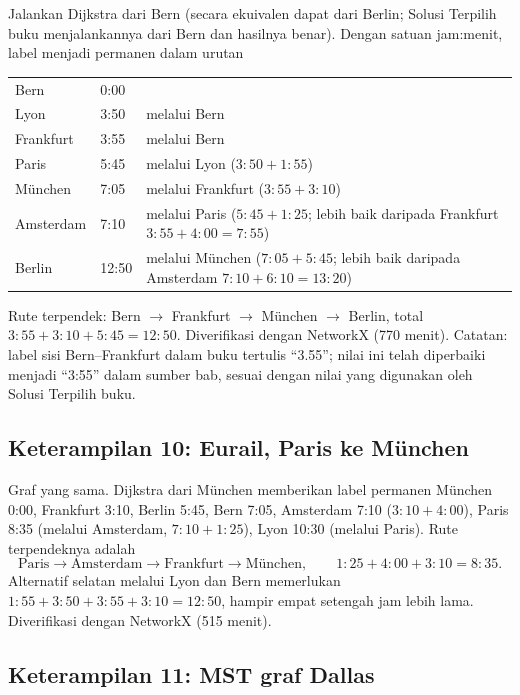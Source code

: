 Jalankan Dijkstra dari Bern (secara ekuivalen dapat dari Berlin; Solusi Terpilih buku menjalankannya dari Bern dan hasilnya benar). Dengan satuan jam:menit, label menjadi permanen dalam urutan
\begin{center}
\small
\begin{tabularx}{\linewidth}{@{}llX@{}}
Bern & 0:00 & \\
Lyon & 3:50 & melalui Bern \\
Frankfurt & 3:55 & melalui Bern \\
Paris & 5:45 & melalui Lyon ($3{:}50 + 1{:}55$) \\
M\"unchen & 7:05 & melalui Frankfurt ($3{:}55 + 3{:}10$) \\
Amsterdam & 7:10 & melalui Paris ($5{:}45 + 1{:}25$; lebih baik daripada Frankfurt $3{:}55 + 4{:}00 = 7{:}55$) \\
Berlin & 12:50 & melalui M\"unchen ($7{:}05 + 5{:}45$; lebih baik daripada Amsterdam $7{:}10 + 6{:}10 = 13{:}20$) \\
\end{tabularx}
\end{center}
Rute terpendek: Bern $\to$ Frankfurt $\to$ M\"unchen $\to$ Berlin, total $3{:}55 + 3{:}10 + 5{:}45 = 12{:}50$. Diverifikasi dengan NetworkX (770 menit). Catatan: label sisi Bern--Frankfurt dalam buku tertulis ``3.55''; nilai ini telah diperbaiki menjadi ``3:55'' dalam sumber bab, sesuai dengan nilai yang digunakan oleh Solusi Terpilih buku.

\subsection*{Keterampilan 10: Eurail, Paris ke M\"unchen}

Graf yang sama. Dijkstra dari M\"unchen memberikan label permanen M\"unchen 0:00, Frankfurt 3:10, Berlin 5:45, Bern 7:05, Amsterdam 7:10 ($3{:}10 + 4{:}00$), Paris 8:35 (melalui Amsterdam, $7{:}10 + 1{:}25$), Lyon 10:30 (melalui Paris). Rute terpendeknya adalah
\[
\text{Paris} \to \text{Amsterdam} \to \text{Frankfurt} \to \text{M\"unchen},
\qquad 1{:}25 + 4{:}00 + 3{:}10 = 8{:}35.
\]
Alternatif selatan melalui Lyon dan Bern memerlukan $1{:}55 + 3{:}50 + 3{:}55 + 3{:}10 = 12{:}50$, hampir empat setengah jam lebih lama. Diverifikasi dengan NetworkX (515 menit).

\subsection*{Keterampilan 11: MST graf Dallas}

